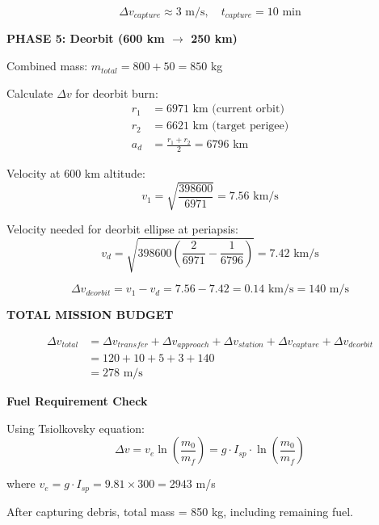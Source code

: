 \documentclass[11pt,a4paper]{article}
\begin{document}
\begin{equation}
\Delta v_{capture} \approx 3 \text{ m/s}, \quad t_{capture} = 10 \text{ min}
\end{equation}

\textbf{PHASE 5: Deorbit (600 km $\rightarrow$ 250 km)}

Combined mass: $m_{total} = 800 + 50 = 850$ kg

Calculate $\Delta v$ for deorbit burn:
\begin{align}
r_1 &= 6971 \text{ km (current orbit)} \\
r_2 &= 6621 \text{ km (target perigee)} \\
a_d &= \frac{r_1 + r_2}{2} = 6796 \text{ km}
\end{align}

Velocity at 600 km altitude:
\begin{equation}
v_1 = \sqrt{\frac{398600}{6971}} = 7.56 \text{ km/s}
\end{equation}

Velocity needed for deorbit ellipse at periapsis:
\begin{equation}
v_{d} = \sqrt{398600\left(\frac{2}{6971} - \frac{1}{6796}\right)} = 7.42 \text{ km/s}
\end{equation}

\begin{equation}
\Delta v_{deorbit} = v_1 - v_{d} = 7.56 - 7.42 = 0.14 \text{ km/s} = 140 \text{ m/s}
\end{equation}

\textbf{TOTAL MISSION BUDGET}

\begin{align}
\Delta v_{total} &= \Delta v_{transfer} + \Delta v_{approach} + \Delta v_{station} + \Delta v_{capture} + \Delta v_{deorbit} \\
&= 120 + 10 + 5 + 3 + 140 \\
&= 278 \text{ m/s}
\end{align}

\textbf{Fuel Requirement Check}

Using Tsiolkovsky equation:
\begin{equation}
\Delta v = v_e \ln\left(\frac{m_0}{m_f}\right) = g \cdot I_{sp} \cdot \ln\left(\frac{m_0}{m_f}\right)
\end{equation}

where $v_e = g \cdot I_{sp} = 9.81 \times 300 = 2943$ m/s

After capturing debris, total mass = 850 kg, including remaining fuel.
\end{document}
